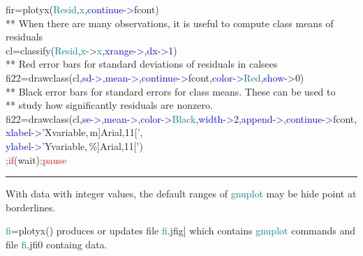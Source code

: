 \begin{example}[plotyxex]
fir=\textcolor{VioletRed}{plotyx}(\textcolor{teal}{Resid},\textcolor{teal}{x},\textcolor{blue}{continue->}fcont)\\ 
{\color{ForestGreen}** When there are many observations, it is useful to compute class means of residuals}\\ 
cl=\textcolor{VioletRed}{classify}(\textcolor{teal}{Resid},\textcolor{teal}{x}->\textcolor{teal}{x},\textcolor{blue}{xrange->},\textcolor{blue}{dx->}1)\\ 
{\color{ForestGreen}** Red error bars for standard deviations of residuals in calsees}\\ 
fi22=\textcolor{VioletRed}{drawclass}(cl,\textcolor{blue}{sd->},\textcolor{blue}{mean->},\textcolor{blue}{continue->}fcont,\textcolor{blue}{color->}\textcolor{teal}{Red},\textcolor{blue}{show->}0)\\ 
{\color{ForestGreen}** Black error bars for standard errors for class means. These can be used to}\\ 
{\color{ForestGreen}** study how significantly residuals are nonzero.}\\ 
fi22=\textcolor{VioletRed}{drawclass}(cl,\textcolor{blue}{se->},\textcolor{blue}{mean->},\textcolor{blue}{color->}\textcolor{teal}{Black},\textcolor{blue}{width->}2,\textcolor{blue}{append->},\textcolor{blue}{continue->}fcont,\\ 
\textcolor{blue}{xlabel->}'Xvariable,\,m]Arial,11[',\\ 
\textcolor{blue}{ylabel->}'Yvariable,\,\%]Arial,11[')\\ 
\textcolor{Red}{;if}(wait)\textcolor{Red}{;pause}\\ 
\end{example} 
\vspace{-7mm} \rule{5cm}{0.1pt} 
\onehalfspacing 
\begin{note} 
With data with integer values, the default ranges of \textcolor{teal}{gnuplot} may be hide point at 
borderlines. 
\end{note} 
\begin{note} 
\textcolor{teal}{fi}=\textcolor{VioletRed}{plotyx}() produces or updates file \textcolor{teal}{fi}.jfig] which contains 
\textcolor{teal}{gnuplot} commands and file \textcolor{teal}{fi}.jfi0 containg data. 
\end{note} 
